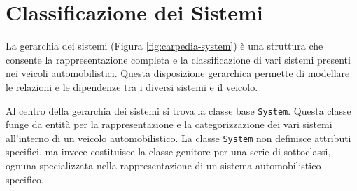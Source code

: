 \begin{figure}[H]
    \label{fig:carpedia-component}
\end{figure}

\section{Classificazione dei Sistemi}

La gerarchia dei sistemi (Figura \ref{fig:carpedia-system}) è una struttura che consente la rappresentazione completa e la classificazione di vari sistemi presenti nei veicoli automobilistici. Questa disposizione gerarchica permette di modellare le relazioni e le dipendenze tra i diversi sistemi e il veicolo.

Al centro della gerarchia dei sistemi si trova la classe base \texttt{System}. Questa classe funge da entità per la rappresentazione e la categorizzazione dei vari sistemi all'interno di un veicolo automobilistico. La classe \texttt{System} non definisce attributi specifici, ma invece costituisce la classe genitore per una serie di sottoclassi, ognuna specializzata nella rappresentazione di un sistema automobilistico specifico.

